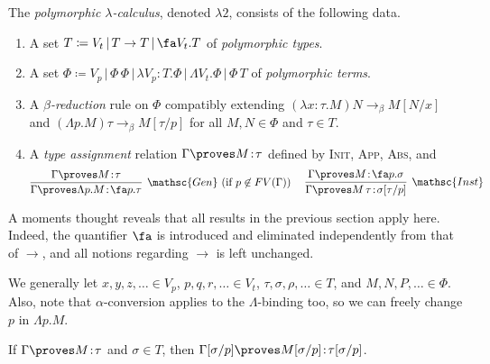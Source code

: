 \documentclass[reqno]{amsart}
\begin{document}
    \begin{definition}
        The \textit{polymorphic $\lambda$-calculus}, denoted $\lambda2$, consists of the following data.
        \begin{enumerate}
            \item A set $T\coloneqq V_t\,|\,T\rightarrow T\,|\,\fa V_t.T$ of \textit{polymorphic types}.
            \item A set $\Phi\coloneqq V_p\,|\,\Phi\,\Phi\,|\,\lambda V_p\!:\!T.\Phi\,|\,\Lambda V_t.\Phi\,|\,\Phi\,T$ of \textit{polymorphic terms}.
            \item A \textit{$\beta$-reduction} rule on $\Phi$ compatibly extending $(\lambda x\!:\!\tau.M)N\rightarrow_\beta M[N/x]$ and $(\Lambda p.M)\tau\rightarrow_\beta M[\tau/p]$ for all $M,N\in\Phi$ and $\tau\in T$.
            \item A \textit{type assignment} relation $\Gamma\proves M\!:\!\tau$ defined by \textsc{Init}, \textsc{App}, \textsc{Abs}, and
                \begin{equation*}
                    \infer[\mathsc{Gen}\ (\textrm{if }p\not\in FV(\Gamma))]{\Gamma\proves\Lambda p.M\!:\!\fa p.\tau}{\Gamma\proves M\!:\!\tau}\ \ \ \ 
                    \infer[\mathsc{Inst}]{\Gamma\proves M\,\tau\!:\!\sigma[\tau/p]}{\Gamma\proves M\!:\!\fa p.\sigma}
                \end{equation*}
        \end{enumerate}
    \end{definition}

    A moments thought reveals that all results in the previous section apply here. Indeed, the quantifier $\fa$ is introduced and eliminated independently from that of $\rightarrow$, and all notions regarding $\rightarrow$ is left unchanged.

    \begin{notation}
        We generally let $x,y,z,\ldots\in V_p$, $p,q,r,\ldots\in V_t$, $\tau,\sigma,\rho,\ldots\in T$, and $M,N,P,\ldots\in\Phi$. Also, note that $\alpha$-conversion applies to the $\Lambda$-binding too, so we can freely change $p$ in $\Lambda p.M$.
    \end{notation}

    \begin{lemma}\label{lem:polymorphic_variable_substitution}
        If $\Gamma\proves M\!:\!\tau$ and $\sigma\in T$, then $\Gamma[\sigma/p]\proves M[\sigma/p]\!:\!\tau[\sigma/p]$.
    \end{lemma}
\end{document}
